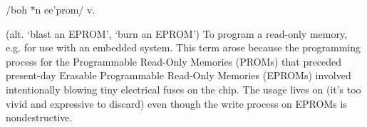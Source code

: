  /boh *n ee'prom/ v.

(alt. `blast an EPROM', `burn an EPROM') To program a read-only memory, e.g. for
use with an embedded system. This term arose because the programming process for
the Programmable Read-Only Memories (PROMs) that preceded present-day Erasable
Programmable Read-Only Memories (EPROMs) involved intentionally blowing tiny
electrical fuses on the chip. The usage lives on (it's too vivid and expressive
to discard) even though the write process on EPROMs is nondestructive.

